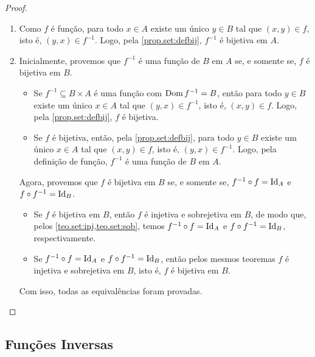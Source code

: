 \begin{proof}
    \leavevmode
        \begin{enumerate}[leftmargin=*, align=left, label=\textbf{(\alph*)}]
            \item Como $f$ é função, para todo $x \in A$ existe um único $y \in B$ tal que $(x,y) \in f$, isto é, $(y,x) \in f^{-1}$. Logo, pela \cref{prop.set:defbij}, $f^{-1}$ é bijetiva em $A$. \blackproof
            \item Inicialmente, provemos que $f^{-1}$ é uma função de $B$ em $A$ se, e somente se, $f$ é bijetiva em $B$.
                \begin{itemize}
                    \item[($\Rightarrow$)] Se $f^{-1} \subseteq B \times A$ é uma função com $\operatorname{Dom} f^{-1} = B$, então para todo $y \in B$ existe um único $x \in A$ tal que $(y,x) \in f^{-1}$, isto é, $(x,y) \in f$. Logo, pela \cref{prop.set:defbij}, $f$ é bijetiva.
                    \item[($\Leftarrow$)] Se $f$ é bijetiva, então, pela \cref{prop.set:defbij}, para todo $y \in B$ existe um único $x \in A$ tal que $(x,y) \in f$, isto é, $(y,x) \in f^{-1}$. Logo, pela definição de função, $f^{-1}$ é uma função de $B$ em $A$.
                \end{itemize}
            Agora, provemos que $f$ é bijetiva em $B$ se, e somente se, $f^{-1} \circ f = \operatorname{Id}_A$ e $f \circ f^{-1} = \operatorname{Id}_{B}$.
                \begin{itemize}
                    \item[($\Rightarrow$)] Se $f$ é bijetiva em $B$, então $f$ é injetiva e sobrejetiva em $B$, de modo que, pelos \cref{teo.set:inj,teo.set:sob}, temos $f^{-1} \circ f = \operatorname{Id}_A$ e $f \circ f^{-1} = \operatorname{Id}_B$, respectivamente.
                    \item[($\Leftarrow$)] Se $f^{-1} \circ f = \operatorname{Id}_A$ e $f \circ f^{-1} = \operatorname{Id}_B$, então pelos mesmos teoremas $f$ é injetiva e sobrejetiva em $B$, isto é, $f$ é bijetiva em $B$.
                \end{itemize}
            Com isso, todas as equivalências foram provadas. \blackproof
        \end{enumerate}
\end{proof}

\subsection{Funções Inversas}

